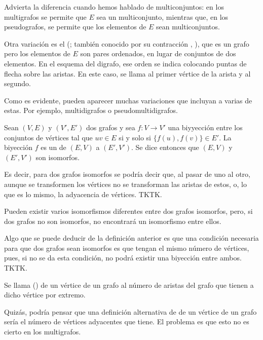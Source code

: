 Advierta la diferencia cuando hemos hablado de multiconjuntos: en los
multigrafos se permite que $E$ sea un multiconjunto, mientras que, en los
pseudografos, se permite que los elementos de $E$ sean multiconjuntos.

Otra variación es el  (; también
conocido por su contracción , ), que es un grafo
pero los elementos de $E$ son pares ordenados, en lugar de conjuntos de dos
elementos. En el esquema del digrafo, ese orden se indica colocando puntas
de flecha sobre las aristas. En este caso, se llama  al primer
vértice de la arista y  al segundo.

Como es evidente, pueden aparecer muchas variaciones que incluyan a varias
de estas. Por ejemplo, multidigrafos o pseudomultidigrafos.

\begin{deffinition}
  Sean $(V, E)$ y $(V', E')$ dos grafos y sea $f: V \longrightarrow V'$ una
  biyyección entre los conjuntos de vértices tal que $uv \in E$ si y solo si
  $\{f(u), f(v)\} \in E'$. La biyección $f$ es un  de $(E,
  V)$ a $(E', V')$. Se dice entonces que $(E, V)$ y $(E', V')$ son
  isomorfos.
\end{deffinition}

Es decir, para dos grafos isomorfos se podría decir que, al pasar de uno al
otro, aunque se transformen los vértices no se transforman las aristas de
estos, o, lo que es lo mismo, la adyacencia de vértices. TKTK.

Pueden existir varios isomorfismos diferentes entre dos grafos isomorfos,
pero, si dos grafos no son isomorfos, no encontrará un isomorfismo entre
ellos.

Algo que se puede deducir de la definición anterior es que una condición
necesaria para que dos grafos sean isomorfos es que tengan el mismo número
de vértices, pues, si no se da esta condición, no podrá existir una
biyección entre ambos. TKTK.

\begin{deffinition}
  Se llama  () de un vértice de un grafo al número de
  aristas del grafo que tienen a dicho vértice por extremo.
\end{deffinition}

Quizás, podría pensar que una definición alternativa de  de un
vértice de un grafo sería el número de vértices adyacentes que tiene. El
problema es que esto no es cierto en los multigrafos.

